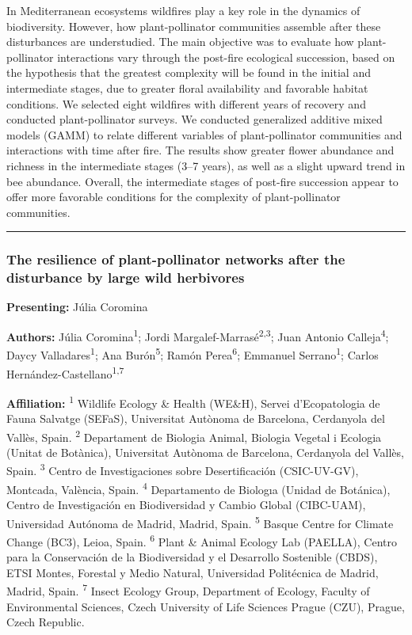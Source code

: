 \documentclass[
  letterpaper,
  DIV=11,
  numbers=noendperiod]{scrartcl}
\begin{document}
In Mediterranean ecosystems wildfires play a key role in the dynamics of
biodiversity. However, how plant-pollinator communities assemble after
these disturbances are understudied. The main objective was to evaluate
how plant-pollinator interactions vary through the post-fire ecological
succession, based on the hypothesis that the greatest complexity will be
found in the initial and intermediate stages, due to greater floral
availability and favorable habitat conditions. We selected eight
wildfires with different years of recovery and conducted
plant-pollinator surveys. We conducted generalized additive mixed models
(GAMM) to relate different variables of plant-pollinator communities and
interactions with time after fire. The results show greater flower
abundance and richness in the intermediate stages (3--7 years), as well
as a slight upward trend in bee abundance. Overall, the intermediate
stages of post-fire succession appear to offer more favorable conditions
for the complexity of plant-pollinator communities.

\begin{center}\rule{0.5\linewidth}{0.5pt}\end{center}

\subsubsection{The resilience of plant-pollinator networks after the
disturbance by large wild
herbivores}\label{the-resilience-of-plant-pollinator-networks-after-the-disturbance-by-large-wild-herbivores}

\textbf{Presenting:} Júlia Coromina

\textbf{Authors:} Júlia Coromina\textsuperscript{1}; Jordi
Margalef-Marrasé\textsuperscript{2,3}; Juan Antonio
Calleja\textsuperscript{4}; Daycy Valladares\textsuperscript{1}; Ana
Burón\textsuperscript{5}; Ramón Perea\textsuperscript{6}; Emmanuel
Serrano\textsuperscript{1}; Carlos
Hernández-Castellano\textsuperscript{1,7}

\textbf{Affiliation:} \textsuperscript{1} Wildlife Ecology \& Health
(WE\&H), Servei d'Ecopatologia de Fauna Salvatge (SEFaS), Universitat
Autònoma de Barcelona, Cerdanyola del Vallès, Spain. \textsuperscript{2}
Departament de Biologia Animal, Biologia Vegetal i Ecologia (Unitat de
Botànica), Universitat Autònoma de Barcelona, Cerdanyola del Vallès,
Spain. \textsuperscript{3} Centro de Investigaciones sobre
Desertificación (CSIC-UV-GV), Montcada, València, Spain.
\textsuperscript{4} Departamento de Biologıa (Unidad de Botánica),
Centro de Investigación en Biodiversidad y Cambio Global (CIBC-UAM),
Universidad Autónoma de Madrid, Madrid, Spain. \textsuperscript{5}
Basque Centre for Climate Change (BC3), Leioa, Spain.
\textsuperscript{6} Plant \& Animal Ecology Lab (PAELLA), Centro para la
Conservación de la Biodiversidad y el Desarrollo Sostenible (CBDS), ETSI
Montes, Forestal y Medio Natural, Universidad Politécnica de Madrid,
Madrid, Spain. \textsuperscript{7} Insect Ecology Group, Department of
Ecology, Faculty of Environmental Sciences, Czech University of Life
Sciences Prague (CZU), Prague, Czech Republic.
\end{document}
